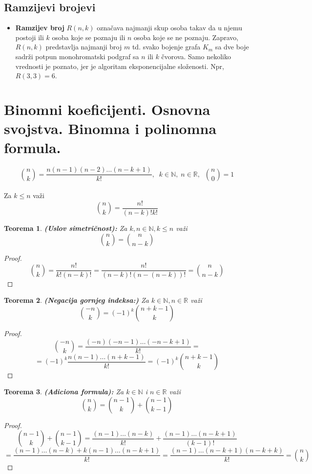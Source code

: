 \documentclass[a4paper,12pt]{article}
\numberwithin{algorithm}{section}
\theoremstyle{plain}
\newtheorem{theorem}{Teorema}[section]
\theoremstyle{definition}
\theoremstyle{remark}
\begin{document}
\subsection{Ramzijevi brojevi}
\begin{itemize}
    \item \textbf{Ramzijev broj} $R(n, k)$ označava najmanji skup osoba takav da u njemu postoji ili $k$ osoba koje se poznaju ili $n$ osoba koje se ne poznaju. Zapravo, $R(n, k)$ predstavlja najmanji broj $m$ td. svako bojenje grafa $K_m$ sa dve boje sadrži potpun monohromatski podgraf sa $n$ ili $k$ čvorova. Samo nekoliko vrednosti je poznato, jer je algoritam eksponencijalne složenosti. Npr, $R(3, 3) = 6$.
\end{itemize}

\section{Binomni koeficijenti. Osnovna svojstva. Binomna i polinomna formula. }

\[
    {{n}\choose k} = \frac{n(n-1)(n-2)\dots(n-k+1)}{k!}, \;\; k \in \mathbb{N}, \; n \in \mathbb{R}, \;\; {{n}\choose 0} = 1
\]\\

Za $k \leq n$ važi
\[
    {{n}\choose k} = \frac{n!}{(n-k)!k!}
\]

\begin{theorem} \textbf{(Uslov simetričnost):}
    Za $k, n \in \mathbb{N}, k \leq n$ važi
    \[
        {{n} \choose k} = {{n} \choose {n-k}}
    \]
\end{theorem}
\begin{proof}
    \[
        {{n} \choose k} = \frac{n!}{k!(n - k)!} = \frac{n!}{(n-k)! (n - (n-k))!} = {{n} \choose {n-k}}
    \]
\end{proof}

\begin{theorem}
    \textbf{(Negacija gornjeg indeksa:)}
     Za $k \in \mathbb{N}, n \in \mathbb{R}$ važi
     \[ {{-n} \choose k} = (-1)^k {{n + k - 1} \choose k} \]
\end{theorem}
\begin{proof}
    \[
        {{-n} \choose k} = \frac{(-n)(-n - 1)\ldots (-n - k + 1)}{k!} = 
    \]
    \[
        =(-1)^k \frac{n(n-1)\ldots(n + k - 1)}{k!} = (-1)^k {{n + k - 1} \choose k}
    \]
\end{proof}

\begin{theorem}
    \textbf{(Adiciona formula):} Za $k \in \mathbb{N}$ i $n \in \mathbb{R}$ važi
    \[ {{n} \choose k} = {{n - 1} \choose k} + {{n - 1} \choose {k - 1}} \]
\end{theorem}
\begin{proof}
    \[
        {{n - 1} \choose k} + {{n - 1} \choose {k - 1}} = \frac{(n - 1)\ldots (n - k)}{k!} + \frac{(n - 1)\ldots (n - k + 1)}{(k - 1)!}
    \]
    \[
        = \frac{(n - 1)\ldots (n - k) + k(n - 1)\ldots (n - k + 1)}{k!} = \frac{(n - 1)\ldots(n - k + 1)(n - k + k)}{k!} = {{n} \choose k}
    \]
\end{proof}
\end{document}
